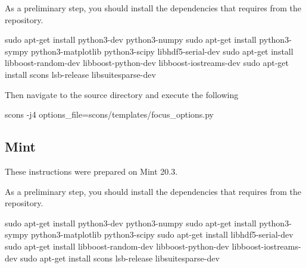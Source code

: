 \documentclass{esysdoc}
\begin{document}
\noindent As a preliminary step, you should install the dependencies that \esfinley requires from the repository.
\begin{shellCode}
sudo apt-get install python3-dev python3-numpy
sudo apt-get install python3-sympy python3-matplotlib python3-scipy libhdf5-serial-dev
sudo apt-get install libboost-random-dev libboost-python-dev libboost-iostreams-dev
sudo apt-get install scons lsb-release libsuitesparse-dev
\end{shellCode}



\noindent Then navigate to the source directory and execute the following
\begin{shellCode}
scons -j4 options_file=scons/templates/focus_options.py
\end{shellCode}


\subsection{Mint}\label{sec:mintsrc}
These instructions were prepared on Mint 20.3. \newline

\noindent As a preliminary step, you should install the dependencies that \esfinley requires from the repository.
\begin{shellCode}
sudo apt-get install python3-dev python3-numpy
sudo apt-get install python3-sympy python3-matplotlib python3-scipy
sudo apt-get install libhdf5-serial-dev
sudo apt-get install libboost-random-dev libboost-python-dev libboost-iostreams-dev
sudo apt-get install scons lsb-release libsuitesparse-dev
\end{shellCode}
\end{document}
